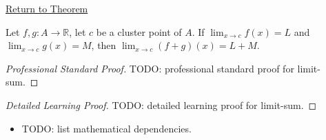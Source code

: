 \newpage
{}
\label{prf:limit-sum}

\begin{remark*}[Return]
\hyperref[thm:limit-sum]{Return to Theorem}
\end{remark*}

\begin{theorem*}
Let $f, g : A \to \mathbb{R}$, let $c$ be a cluster point of $A$. If
$\lim_{x\to c}f(x)=L$ and $\lim_{x\to c}g(x)=M$, then
$\lim_{x\to c}(f+g)(x) = L+M$.
\end{theorem*}

\begin{proof}[Professional Standard Proof]
\LRAProofBodyStart
TODO: professional standard proof for limit-sum.
\end{proof}

\begin{proof}[Detailed Learning Proof]
\LRAProofBodyStart
TODO: detailed learning proof for limit-sum.
\end{proof}

\begin{remark*}
\end{remark*}

\begin{dependencies}
\begin{itemize}
  \item TODO: list mathematical dependencies.
\end{itemize}
\end{dependencies}

\clearpage
